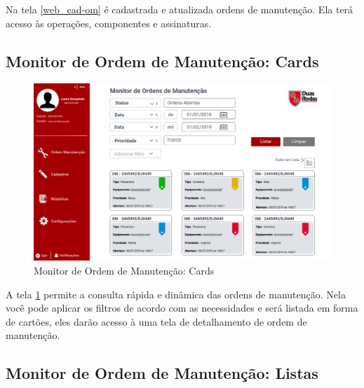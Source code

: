 Na tela \ref{web_cad-om} é cadastrada e atualizada ordens de manutenção. Ela terá acesso às operações, componentes e assinaturas.

\newpage
\subsection{Monitor de Ordem de Manutenção: Cards}

\begin{figure}[htb]
	\caption{\label{web_monitor-om-card}Monitor de Ordem de Manutenção: Cards}
	\begin{center}
		\includegraphics[scale=0.45]{./Figuras/web/monitor-om-card.png}
	\end{center}
\end{figure}

A tela \ref{web_monitor-om-card} permite a consulta rápida e dinâmica das ordens de manutenção. Nela você pode aplicar os filtros de acordo com as \newline necessidades e será listada em forma de cartões, eles darão acesso à uma tela de detalhamento de ordem de manutenção.

\newpage
\subsection{Monitor de Ordem de Manutenção: Listas}

